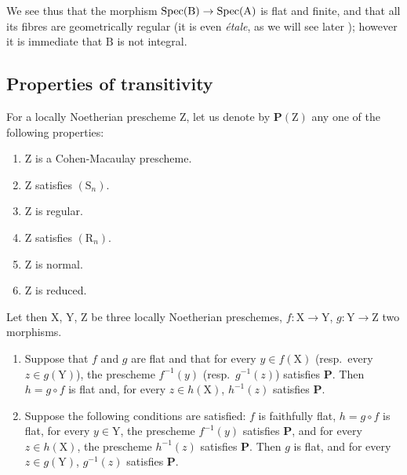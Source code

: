 \begin{remarks}[6.5.5]
\begin{enumerate}[label=(\roman*)]
We see thus that the morphism $\operatorname{Spec}(\mathrm{B})\to\operatorname{Spec}(\mathrm{A})$ is flat and finite, and that all its fibres are geometrically regular (it is even \emph{\'etale}, as we will see later ); however it is immediate that $\mathrm{B}$ is not integral.
\end{enumerate}
\end{remarks}

\subsection{Properties of transitivity}
\label{subsection:IV.6.6}

\begin{proposition}[6.6.1]
\label{IV.6.6.1}
For a locally Noetherian prescheme $\mathrm{Z}$, let us denote by $\boldsymbol{P}(\mathrm{Z})$ any one of the following properties:
\begin{enumerate}[label=\emph{\alph*)}]
  \item $\mathrm{Z}$ is a Cohen-Macaulay prescheme.
  \item $\mathrm{Z}$ satisfies $(\mathrm{S}_n)$.
  \item $\mathrm{Z}$ is regular.
  \item $\mathrm{Z}$ satisfies $(\mathrm{R}_n)$.
  \item $\mathrm{Z}$ is normal.
  \item $\mathrm{Z}$ is reduced.
\end{enumerate}
Let then $\mathrm{X}$, $\mathrm{Y}$, $\mathrm{Z}$ be three locally Noetherian preschemes, $f:\mathrm{X}\to\mathrm{Y}$, $g:\mathrm{Y}\to\mathrm{Z}$ two morphisms.
\begin{enumerate}[label=\upshape(\roman*)]
  \item Suppose that $f$ and $g$ are flat and that for every $y\in f(\mathrm{X})$ \textnormal{(resp.\ }every $z\in g(\mathrm{Y})$\textnormal{)}, the prescheme $f^{-1}(y)$ \textnormal{(resp.\ }$g^{-1}(z)$\textnormal{)} satisfies $\boldsymbol{P}$. Then $h=g\circ f$ is flat and, for every $z\in h(\mathrm{X})$, $h^{-1}(z)$ satisfies $\boldsymbol{P}$.

  \item Suppose the following conditions are satisfied: $f$ is faithfully flat, $h=g\circ f$ is flat, for every $y\in\mathrm{Y}$, the prescheme $f^{-1}(y)$ satisfies $\boldsymbol{P}$, and for every $z\in h(\mathrm{X})$, the prescheme $h^{-1}(z)$ satisfies $\boldsymbol{P}$. Then $g$ is flat, and for every $z\in g(\mathrm{Y})$, $g^{-1}(z)$ satisfies $\boldsymbol{P}$.
\end{enumerate}
\end{proposition}

